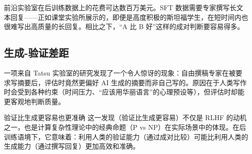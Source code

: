 前沿实验室在后训练数据上的花费可达数百万美元。SFT 数据需要专家撰写长文本回复——正如课堂实验所展示的，即便是高度积极的斯坦福学生，在短时间内也很难写出高质量的长回复。相比之下，``A 比 B 好''这样的成对判断要容易得多。

\subsection{生成-验证差距}

一项来自 Tatsu 实验室的研究发现了一个令人惊讶的现象：自由撰稿专家在被要求写摘要后，评估时竟然更偏好 AI 生成的摘要而非自己写的。原因在于人类写作时会受到各种约束（时间压力、``应该用华丽语言''的心理预设等），但评估时却能更客观地判断质量。

\begin{knowledgebox}{验证比生成更容易也更准确}
这一发现（验证比生成更容易）不仅是 RLHF 的动机之一，也是计算复杂性理论中的经典命题（P vs NP）在实际场景中的体现。在后训练语境下，它意味着：利用人类的验证能力（通过成对比较）可能比利用人类的生成能力（通过撰写回复）更加高效和准确。
\end{knowledgebox}


